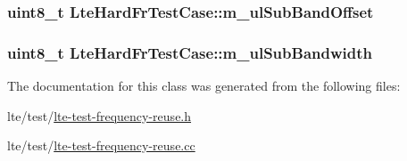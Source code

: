 \subsubsection[{\texorpdfstring{m\+\_\+ul\+Sub\+Band\+Offset}{m_ulSubBandOffset}}]{\setlength{\rightskip}{0pt plus 5cm}uint8\+\_\+t Lte\+Hard\+Fr\+Test\+Case\+::m\+\_\+ul\+Sub\+Band\+Offset\hspace{0.3cm}{\ttfamily [private]}}\hypertarget{classLteHardFrTestCase_a5855d83febfdbf617cc86a8acaa97504}{}\label{classLteHardFrTestCase_a5855d83febfdbf617cc86a8acaa97504}
\subsubsection[{\texorpdfstring{m\+\_\+ul\+Sub\+Bandwidth}{m_ulSubBandwidth}}]{\setlength{\rightskip}{0pt plus 5cm}uint8\+\_\+t Lte\+Hard\+Fr\+Test\+Case\+::m\+\_\+ul\+Sub\+Bandwidth\hspace{0.3cm}{\ttfamily [private]}}\hypertarget{classLteHardFrTestCase_a466dbdebec3cfdf98011aa4a5de0ad08}{}\label{classLteHardFrTestCase_a466dbdebec3cfdf98011aa4a5de0ad08}


The documentation for this class was generated from the following files\+:\begin{DoxyCompactItemize}
\item 
lte/test/\hyperlink{lte-test-frequency-reuse_8h}{lte-\/test-\/frequency-\/reuse.\+h}\item 
lte/test/\hyperlink{lte-test-frequency-reuse_8cc}{lte-\/test-\/frequency-\/reuse.\+cc}\end{DoxyCompactItemize}
